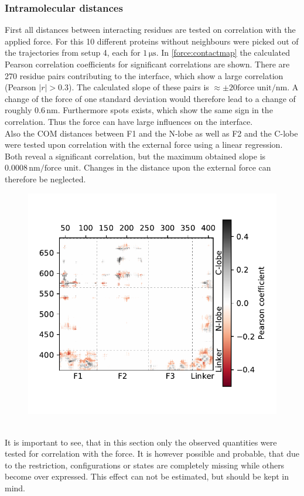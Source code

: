 \subsubsection{Intramolecular distances}
\label{forceana:intramolec}
First all distances between interacting residues are tested on correlation with the applied force. For this 10 different proteins without neighbours were picked out of the trajectories from setup 4, each for $1\,\si{\micro\second}$. In \autoref{force:contactmap} the calculated Pearson correlation coefficients for significant correlations are shown. There are 270 residue pairs contributing to the interface, which show a large correlation (Pearson $\left|r\right| > 0.3$). The calculated slope of these pairs is $\approx \pm  20 \text{force unit}/\si{\nano\metre}$. A change of the force of one standard deviation would therefore lead to a change of roughly $0.6\,\si{\nano\metre}$. Furthermore spots exists, which show the same sign in the correlation. Thus the force can have large influences on the interface.\\
Also the COM distances between F1 and the N-lobe as well as F2 and the C-lobe were tested upon correlation with the external force using a linear regression. Both reveal a significant correlation, but the maximum obtained slope is $0.0008\, \si{\nano\metre}/\text{force unit}$. Changes in the distance upon the external force can therefore be neglected.
%
%
%
\begin{figure}
	\centering
	\includegraphics[width=.7\textwidth]{figures/results/interface_corr}
	\label{force:contactmap}
\end{figure}
%
%
%
\\
It is important to see, that in this section only the observed quantities were tested for correlation with the force. It is however possible and probable, that due to the restriction, configurations or states are completely missing while others become over expressed. This effect can not be estimated, but should be kept in mind.